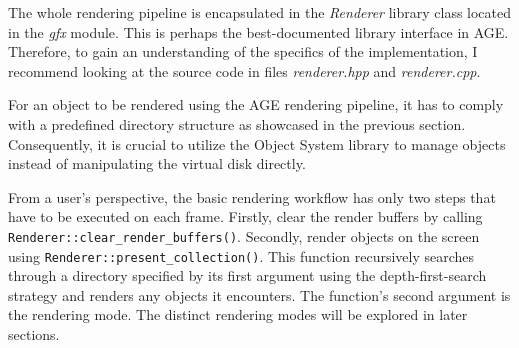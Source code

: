 \documentclass[
  digital,     %
  oneside,     %
  nosansbold,  %
  nocolorbold, %
  lof,         %
  lot,         %
]{fithesis4}
\begin{document}
The whole rendering pipeline is encapsulated in the \textit{Renderer} library class located
in the \textit{gfx} module. This is perhaps the best-documented library interface in AGE.
Therefore, to gain an understanding of the specifics of the implementation,
I recommend looking at the source code in files \textit{renderer.hpp} and \textit{renderer.cpp}.

For an object to be rendered using the AGE rendering pipeline, it has to comply with a predefined
directory structure as showcased in the previous section. Consequently, it is crucial to utilize
the Object System library to manage objects instead of manipulating the virtual disk directly.

From a user's perspective, the basic rendering workflow has only two steps that have to be executed on each frame.
Firstly, clear the render buffers by calling \verb|Renderer::clear_render_buffers()|. Secondly, render objects
on the screen using \verb|Renderer::present_collection()|. This function recursively searches through a directory
specified by its first argument using the depth-first-search strategy and renders any objects it encounters.
The function's second argument is the rendering mode. The distinct rendering modes will be explored
in later sections.
\end{document}
